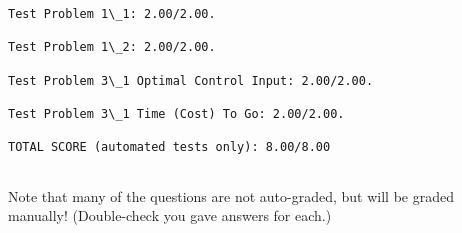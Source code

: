 \documentclass[11pt]{article}
\begin{document}
    \begin{Verbatim}[commandchars=\\\{\}]
Test Problem 1\_1: 2.00/2.00.

Test Problem 1\_2: 2.00/2.00.

Test Problem 3\_1 Optimal Control Input: 2.00/2.00.

Test Problem 3\_1 Time (Cost) To Go: 2.00/2.00.

TOTAL SCORE (automated tests only): 8.00/8.00


    \end{Verbatim}

    Note that many of the questions are not auto-graded, but will be graded
manually! (Double-check you gave answers for each.)


    
    
    
    
\end{document}
